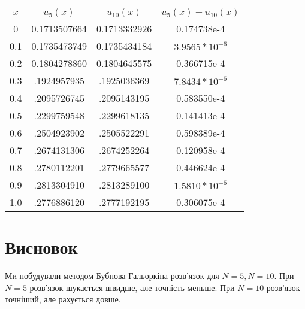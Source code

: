 \documentclass[14pt,a4paper]{scrartcl}
\begin{document}
\begin{center}
	\begin{tabular}{ | c | c | c | c | }
		\hline
		$x$ & $u_5(x)$ & $u_{10}(x)$& $u_5(x) -u_{10}(x)$ \\ \hline
		0 & 0.1713507664 & 0.1713332926 & 0.174738e-4 \\
		0.1 & 0.1735473749 & 0.1735434184 & $3.9565*10^{-6}$ \\
		0.2 & 0.1804278860 & 0.1804645575 & 0.366715e-4 \\
		0.3 & .1924957935 & .1925036369 & $7.8434*10^{-6}$\\
		0.4 & .2095726745 & .2095143195 & 0.583550e-4 \\
		0.5 & .2299759548 & .2299618135 & 0.141413e-4 \\
		0.6 & .2504923902 & .2505522291 & 0.598389e-4 \\
		0.7 & .2674131306 & .2674252264 & 0.120958e-4 \\
		0.8 & .2780112201 & .2779665577 & 0.446624e-4  \\
		0.9 & .2813304910 & .2813289100 & $1.5810*10^{-6}$ \\
		1.0 & .2776886120 & .2777192195 & 0.306075e-4 \\
		\hline
	\end{tabular}
\end{center}

\section{Висновок}
Ми побудували методом Бубнова-Гальоркіна розв'язок для $N=5, N=10$. При $N=5$ розв'язок шукається швидше, але точність меньше. При $N=10$ розв'язок точніший, але рахується довше.

	
\end{document}
